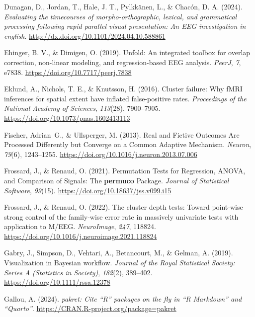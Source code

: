 \documentclass[
  doc,
  floatsintext,
  longtable,
  a4paper,
  nolmodern,
  notxfonts,
  notimes,
  colorlinks=true,linkcolor=blue,citecolor=blue,urlcolor=blue]{apa7}
\newlength{\cslhangindent}
\newenvironment{CSLReferences}[2] %
 {\begin{list}{}{%
  \setlength{\itemindent}{0pt}
  \setlength{\leftmargin}{0pt}
  \setlength{\parsep}{0pt}
  \ifodd #1
   \setlength{\leftmargin}{\cslhangindent}
   \setlength{\itemindent}{-1\cslhangindent}
  \fi
  \setlength{\itemsep}{#2\baselineskip}}}
 {\end{list}}
\begin{document}
\begin{CSLReferences}{1}{0}
Dunagan, D., Jordan, T., Hale, J. T., Pylkkänen, L., \& Chacón, D. A.
(2024). \emph{Evaluating the timecourses of morpho-orthographic,
lexical, and grammatical processing following rapid parallel visual
presentation: An EEG investigation in english}.
\url{http://dx.doi.org/10.1101/2024.04.10.588861}

Ehinger, B. V., \& Dimigen, O. (2019). Unfold: An integrated toolbox for
overlap correction, non-linear modeling, and regression-based {EEG}
analysis. \emph{PeerJ}, \emph{7}, e7838.
\url{https://doi.org/10.7717/peerj.7838}

Eklund, A., Nichols, T. E., \& Knutsson, H. (2016). Cluster failure: Why
fMRI inferences for spatial extent have inflated false-positive rates.
\emph{Proceedings of the National Academy of Sciences}, \emph{113}(28),
7900--7905. \url{https://doi.org/10.1073/pnas.1602413113}

Fischer, Adrian~G., \& Ullsperger, M. (2013). Real and Fictive Outcomes
Are Processed Differently but Converge on a Common Adaptive Mechanism.
\emph{Neuron}, \emph{79}(6), 1243--1255.
\url{https://doi.org/10.1016/j.neuron.2013.07.006}

Frossard, J., \& Renaud, O. (2021). Permutation Tests for Regression,
ANOVA, and Comparison of Signals: The {\textbf{permuco}} Package.
\emph{Journal of Statistical Software}, \emph{99}(15).
\url{https://doi.org/10.18637/jss.v099.i15}

Frossard, J., \& Renaud, O. (2022). The cluster depth tests: Toward
point-wise strong control of the family-wise error rate in massively
univariate tests with application to M/EEG. \emph{NeuroImage},
\emph{247}, 118824.
\url{https://doi.org/10.1016/j.neuroimage.2021.118824}

Gabry, J., Simpson, D., Vehtari, A., Betancourt, M., \& Gelman, A.
(2019). Visualization in Bayesian work{fl}ow. \emph{Journal of the Royal
Statistical Society: Series A (Statistics in Society)}, \emph{182}(2),
389--402. \url{https://doi.org/10.1111/rssa.12378}

Gallou, A. (2024). \emph{{pakret}: Cite {``{R}''} packages on the fly in
{``{R Markdown}''} and {``{Quarto}''}}.
\url{https://CRAN.R-project.org/package=pakret}


\end{CSLReferences}
\end{document}
